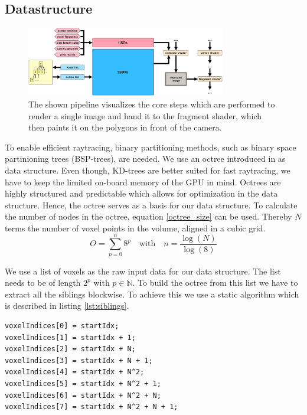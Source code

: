 \documentclass[12pt,conference]{IEEEtran}
\begin{document}
\subsection{Datastructure}
\begin{figure}[htp]
	\centering
	\includegraphics[width=0.775\textwidth]{images/rendering_process.png}
	\caption{The shown pipeline visualizes the core steps which are performed to render a single image and hand it to the fragment shader, which then paints it on the polygons in front of the camera.}
	\label{fig:renderingprocess}
\end{figure}
To enable efficient raytracing, binary partitioning methods, such as binary space partinioning trees (BSP-trees), are needed. We use an octree introduced in \cite{meagher1982geometric} as data structure. Even though, KD-trees are better suited for fast raytracing\cite{havran2000heuristic}, we have to keep the limited on-board memory of the GPU in mind. Octrees are highly structured and predictable which allows for optimization in the data structure\cite{crassin2009gigavoxels}.
Hence, the octree serves as a basis for our data structure. To calculate the number of nodes in the octree, equation \ref{octree_size} can be used. Thereby $N$ terms the number of voxel points in the volume, aligned in a cubic grid.
\begin{equation} 
O = \sum\limits_{p=0}^{n} 8^{p} \quad \textrm{with} \quad n = \frac{\log(N)}{\log(8)}
\label{octree_size} 
\end{equation}

We use a list of voxels as the raw input data for our data structure. The list needs to be of length $2^p$ with $p \in \mathbb{N}$. To build the octree from this list we have to extract all the siblings blockwise. To achieve this we use a static algorithm which is described in listing \ref{lst:siblings}.

\begin{lstlisting}[label=lst:siblings, caption={To find the siblings of a given voxel inside the input list we use this static algorithm. Aside from the index of the first voxel we also need the side length of the cubic volume, labeled as $N$ in the above listing.}]
voxelIndices[0] = startIdx;
voxelIndices[1] = startIdx + 1;
voxelIndices[2] = startIdx + N;
voxelIndices[3] = startIdx + N + 1;
voxelIndices[4] = startIdx + N^2;
voxelIndices[5] = startIdx + N^2 + 1;
voxelIndices[6] = startIdx + N^2 + N;
voxelIndices[7] = startIdx + N^2 + N + 1;
\end{lstlisting}
\end{document}
